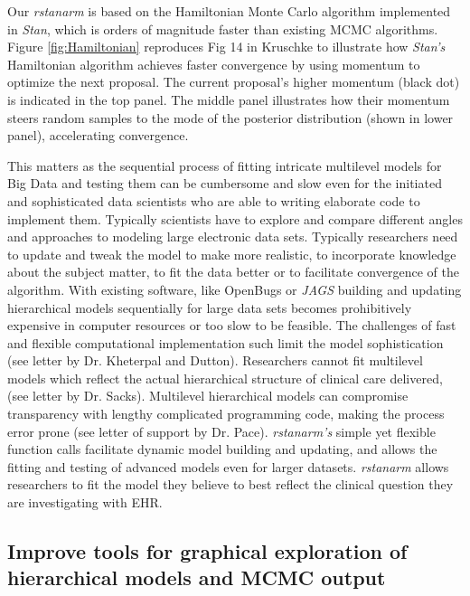 \documentclass[11pt,notitlepage]{article}
\begin{document}
Our \textit{rstanarm} is based on the Hamiltonian Monte Carlo algorithm 
implemented in \textit{Stan}, which is orders of magnitude faster than existing 
MCMC algorithms. Figure \ref{fig:Hamiltonian} reproduces Fig 14 in 
Kruschke \cite{Kruschke_Book_2014} to illustrate how \textit{Stan's} 
Hamiltonian algorithm achieves faster convergence by using momentum to 
optimize the next proposal. The current proposal's higher momentum (black dot) 
is indicated in the top panel. The middle panel illustrates how their momentum 
steers random samples to the mode of the posterior distribution (shown in lower 
panel), accelerating convergence. 

This matters as the sequential process of fitting intricate multilevel models for 
Big Data  and testing them can be cumbersome and slow even for the initiated 
and sophisticated data scientists who are able to writing elaborate code to 
implement them. Typically scientists have to explore and compare different 
angles and approaches to modeling large electronic data sets. Typically 
researchers need to update and tweak the model to make more realistic, to 
incorporate knowledge about the subject matter, to fit the data better or 
to facilitate convergence of the algorithm. With existing software, like 
OpenBugs or \textit{JAGS} building and updating hierarchical models 
sequentially for large data sets becomes prohibitively expensive in 
computer resources or too slow to be feasible. The challenges of fast 
and flexible computational implementation such limit the model sophistication 
(see letter by Dr. Kheterpal and Dutton). Researchers cannot fit multilevel 
models which reflect the actual hierarchical structure of clinical care delivered, 
(see letter by Dr. Sacks). Multilevel hierarchical models can compromise 
transparency with lengthy complicated programming code, making the process 
error prone (see letter of support by Dr. Pace). \textit{rstanarm's} simple 
yet flexible function calls facilitate dynamic model building and updating, 
and allows the fitting and testing of advanced models even for larger 
datasets. \textit{rstanarm} allows researchers to fit the model they 
believe to best reflect the clinical question they are investigating with EHR.

\subsection*{Improve tools for graphical exploration of hierarchical models and MCMC output}
\end{document}
